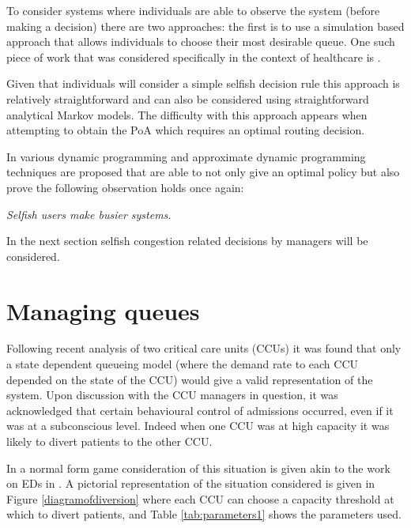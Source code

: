 \documentclass[a4paper,11pt]{article}
\begin{document}
To consider systems where individuals are able to observe the system (before making a decision) there are two approaches: the first is to use a simulation based approach that allows individuals to choose their most desirable queue.
One such piece of work that was considered specifically in the context of healthcare is \cite{Knight2010}.

Given that individuals will consider a simple selfish decision rule this approach is relatively straightforward and can also be considered using straightforward analytical Markov models.
The difficulty with this approach appears when attempting to obtain the PoA which requires an optimal routing decision.

In \cite{Shone2014} various dynamic programming and approximate dynamic programming techniques are proposed that are able to not only give an optimal policy but also prove the following observation holds once again:

\begin{center}
\textit{Selfish users make busier systems.}
\end{center}

In the next section selfish congestion related decisions by managers will be considered.

\section{Managing queues}\label{sec:managingqueues}

Following recent analysis of two critical care units (CCUs) it was found that only a state dependent queueing model (where the demand rate to each CCU depended on the state of the CCU) would give a valid representation of the system.
Upon discussion with the CCU managers in question, it was acknowledged that certain behavioural control of admissions occurred, even if it was at a subconscious level.
Indeed when one CCU was at high capacity it was likely to divert patients to the other CCU.

In \cite{knight2014} a normal form game consideration of this situation is given akin to the work on EDs in \cite{Deo2011}.
A pictorial representation of the situation considered is given in Figure \ref{diagramofdiversion} where each CCU can choose a capacity threshold at which to divert patients, and Table \ref{tab:parameters1} shows the parameters used.
\end{document}
